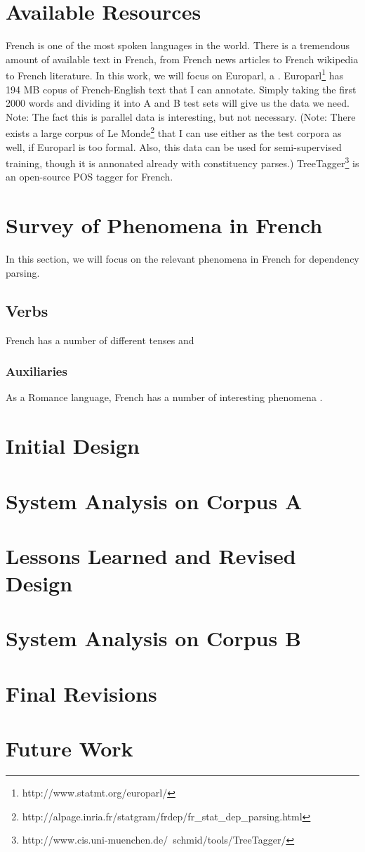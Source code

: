 \documentclass[11pt,letterpaper]{article}
\begin{document}
\section{Available Resources}
French is one of the most spoken languages in the world. There is a tremendous amount of available text in French, from French news articles to French wikipedia to French literature. In this work, we will focus on Europarl, a . Europarl\footnote{http://www.statmt.org/europarl/} has 194 MB copus of French-English text that I can annotate. Simply taking the first 2000 words and dividing it into A and B test sets will give us the data we need. Note: The fact this is parallel data is interesting, but not necessary. (Note: There exists a large corpus of Le Monde\footnote{http://alpage.inria.fr/statgram/frdep/fr_stat_dep_parsing.html} that I can use either as the test corpora as well, if Europarl is too formal. Also, this data can be used for semi-supervised training, though it is annonated already with constituency parses.) 
TreeTagger\footnote{http://www.cis.uni-muenchen.de/~schmid/tools/TreeTagger/} is an open-source POS tagger for French. 

\section{Survey of Phenomena in French}
In this section, we will focus on the relevant phenomena in French for dependency parsing. 
\subsection{Verbs}
French has a number of different tenses and 
\subsubsection{Auxiliaries}
As a Romance language, French has a number of interesting phenomena . 


\section{Initial Design}

\section{System Analysis on Corpus A}

\section{Lessons Learned and Revised Design}

\section{System Analysis on Corpus B}

\section{Final Revisions}

\section{Future Work}







\label{lastpage}
\end{document}
